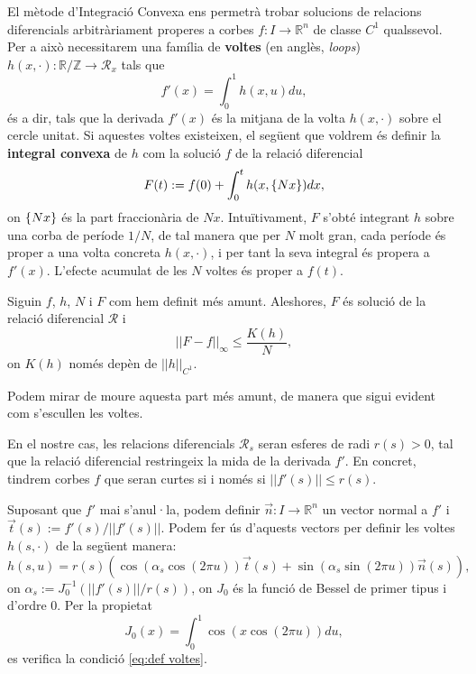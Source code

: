 El mètode d'Integració Convexa ens permetrà trobar solucions de relacions diferencials arbitràriament properes a corbes $f:I\to\mathbb R^n$ de classe $C^1$ qualssevol. Per a això necessitarem una família de \textbf{voltes} (en anglès, \textit{loops}) $h(x, \cdot): \mathbb R / \mathbb Z \to \mathcal R_x$ tals que 
\begin{equation}\label{eq:def voltes}
    f'(x) = \int_0^1 h(x, u)  du,
\end{equation}
és a dir, tals que la derivada $f'(x)$ és la mitjana de la volta $h(x, \cdot)$ sobre el cercle unitat. Si aquestes voltes existeixen, el següent que voldrem és definir la \textbf{integral convexa} de $h$ com la solució $f$ de la relació diferencial 
\begin{equation*}
    F(t) := f(0) + \int_0^t h(x, \{Nx\})  dx,
\end{equation*}
on $\{Nx\}$ és la part fraccionària de $Nx$. Intuïtivament, $F$ s'obté integrant $h$ sobre una corba de període $1/N$, de tal manera que per $N$ molt gran, cada període és proper a una volta concreta $h(x, \cdot)$, i per tant la seva integral és propera a $f'(x)$. L'efecte acumulat de les $N$ voltes és proper a $f(t)$.

\begin{lema}\label{lema:C0-1D}
    Siguin $f$, $h$, $N$ i $F$ com hem definit més amunt. Aleshores, $F$ és solució de la relació diferencial $\mathcal R$ i 
    \begin{equation}
    ||F-f||_\infty \le \frac{K(h)}{N},
    \end{equation}
    on $K(h)$ només depèn de $||h||_{C^1}$.
\end{lema}

{\color{blue} Podem mirar de moure aquesta part més amunt, de manera que sigui evident com s'escullen les voltes.}

En el nostre cas, les relacions diferencials $\mathcal R_s$ seran esferes de radi $r(s)>0$, tal que la relació diferencial restringeix la mida de la derivada $f'$. En concret, tindrem corbes $f$ que seran curtes si i només si $||f'(s)||\le r(s)$.

Suposant que $f'$ mai s'anul·la, podem definir $\vec n:I\to\mathbb R^n$ un vector normal a $f'$ i $\vec t(s):=f'(s)/||f'(s)||$. Podem fer ús d'aquests vectors per definir les voltes $h(s, \cdot)$ de la següent manera:
\begin{equation}
    h(s, u) = r(s)(\cos(\alpha_s\cos(2\pi u))\vec t(s) + \sin(\alpha_s\sin(2\pi u))\vec n(s)),
\end{equation}
on $\alpha_s := J_0^{-1}(||f'(s)||/r(s))$, on $J_0$ és la funció de Bessel de primer tipus i d'ordre 0. Per la propietat
\begin{equation}
    J_0(x) = \int_0^1 \cos(x\cos(2\pi u)) du,
\end{equation}
es verifica la condició \ref{eq:def voltes}.

